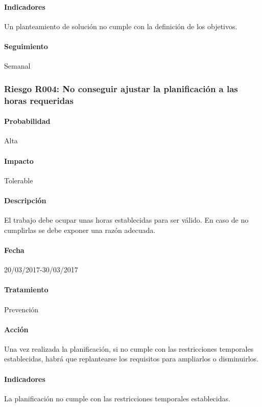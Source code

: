 \documentclass[10pt,a4paper]{article}
\begin{document}
				\paragraph{Indicadores} Un planteamiento de solución no cumple con la definición de los objetivos. %
				\paragraph{Seguimiento}	Semanal %
				
			\subsubsection{Riesgo R004: No conseguir ajustar la planificación a las horas requeridas }
				\paragraph{Probabilidad} Alta
				\paragraph{Impacto}	Tolerable
				\paragraph{Descripción} El trabajo debe ocupar unas horas establecidas para ser válido. En caso de no cumplirlas se debe exponer una razón adecuada.
				\paragraph{Fecha} 20/03/2017-30/03/2017
				\paragraph{Tratamiento} Prevención %
				\paragraph{Acción} Una vez realizada la planificación, si no cumple con las restricciones temporales establecidas, habrá que replantearse los requisitos para ampliarlos o disminuirlos.  %
				\paragraph{Indicadores} La planificación no cumple con las restricciones temporales establecidas. %
				
\end{document}
